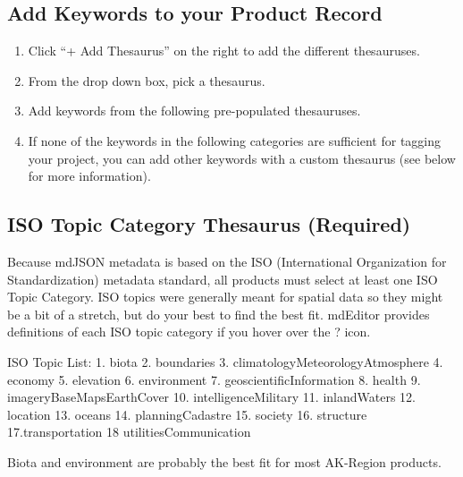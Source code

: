 \documentclass[
]{book}
\makeatletter
\providecommand{\tightlist}{%
  \setlength{\itemsep}{0pt}\setlength{\parskip}{0pt}}
\newenvironment{kframe}{%
\medskip{}
\setlength{\fboxsep}{.8em}
 \def\at@end@of@kframe{}%
 \ifinner\ifhmode%
  \def\at@end@of@kframe{\end{minipage}}%
  \begin{minipage}{\columnwidth}%
 \fi\fi%
 \def\FrameCommand##1{\hskip\@totalleftmargin \hskip-\fboxsep
 \colorbox{shadecolor}{##1}\hskip-\fboxsep
     \hskip-\linewidth \hskip-\@totalleftmargin \hskip\columnwidth}%
 \MakeFramed {\advance\hsize-\width
   \@totalleftmargin\z@ \linewidth\hsize
   \@setminipage}}%
 {\par\unskip\endMakeFramed%
 \at@end@of@kframe}
\newenvironment{rmdblock}[1]
  {
  \begin{itemize}
  \renewcommand{\labelitemi}{
    \raisebox{-.7\height}[0pt][0pt]{
      {\setkeys{Gin}{width=3em,keepaspectratio}\texttt{[image: images/\#1]}}
    }
  }
  \setlength{\fboxsep}{1em}
  \begin{kframe}
  \item
  }
  {
  \end{kframe}
  \end{itemize}
  }
\newenvironment{rmdtip}
  {\begin{rmdblock}{tip}}
  {\end{rmdblock}}
\makeatother
\begin{document}
\hypertarget{add-keywords-to-your-product-record}{%
\subsection*{Add Keywords to your Product Record}\label{add-keywords-to-your-product-record}}

\begin{enumerate}
\def\labelenumi{\arabic{enumi}.}
\tightlist
\item
  Click ``+ Add Thesaurus'' on the right to add the different thesauruses.
\item
  From the drop down box, pick a thesaurus.
\item
  Add keywords from the following pre-populated thesauruses.
\item
  If none of the keywords in the following categories are sufficient for tagging your project, you can add other keywords with a custom thesaurus (see below for more information).
\end{enumerate}

\hypertarget{iso-topic-category-thesaurus-required-1}{%
\subsection*{ISO Topic Category Thesaurus (Required)}\label{iso-topic-category-thesaurus-required-1}}

Because mdJSON metadata is based on the ISO (International Organization for Standardization) metadata standard, all products must select at least one ISO Topic Category. ISO topics were generally meant for spatial data so they might be a bit of a stretch, but do your best to find the best fit. mdEditor provides definitions of each ISO topic category if you hover over the ? icon.

ISO Topic List:
1. biota
2. boundaries
3. climatologyMeteorologyAtmosphere
4. economy
5. elevation
6. environment
7. geoscientificInformation
8. health
9. imageryBaseMapsEarthCover
10. intelligenceMilitary
11. inlandWaters
12. location
13. oceans
14. planningCadastre
15. society
16. structure
17.transportation
18 utilitiesCommunication

\begin{rmdtip}
Biota and environment are probably the best fit for most AK-Region
products.
\end{rmdtip}
\end{document}
